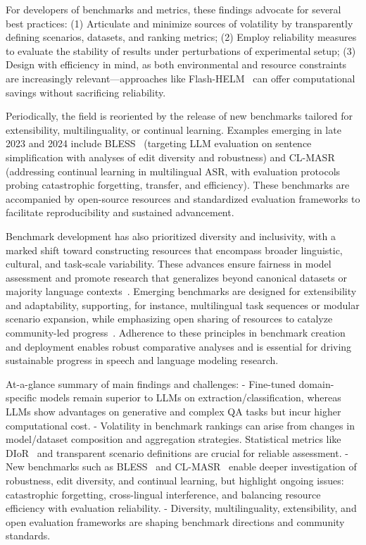 \documentclass[sigconf]{acmart}
\begin{document}
For developers of benchmarks and metrics, these findings advocate for several best practices: (1) Articulate and minimize sources of volatility by transparently defining scenarios, datasets, and ranking metrics; (2) Employ reliability measures to evaluate the stability of results under perturbations of experimental setup; (3) Design with efficiency in mind, as both environmental and resource constraints are increasingly relevant—approaches like Flash-HELM~\cite{ref104} can offer computational savings without sacrificing reliability.

Periodically, the field is reoriented by the release of new benchmarks tailored for extensibility, multilinguality, or continual learning. Examples emerging in late 2023 and 2024 include BLESS~\cite{ref106} (targeting LLM evaluation on sentence simplification with analyses of edit diversity and robustness) and CL-MASR~\cite{ref102} (addressing continual learning in multilingual ASR, with evaluation protocols probing catastrophic forgetting, transfer, and efficiency). These benchmarks are accompanied by open-source resources and standardized evaluation frameworks to facilitate reproducibility and sustained advancement.

Benchmark development has also prioritized diversity and inclusivity, with a marked shift toward constructing resources that encompass broader linguistic, cultural, and task-scale variability. These advances ensure fairness in model assessment and promote research that generalizes beyond canonical datasets or majority language contexts~\cite{ref106}. Emerging benchmarks are designed for extensibility and adaptability, supporting, for instance, multilingual task sequences or modular scenario expansion, while emphasizing open sharing of resources to catalyze community-led progress~\cite{ref102,ref104,ref106}. Adherence to these principles in benchmark creation and deployment enables robust comparative analyses and is essential for driving sustainable progress in speech and language modeling research.

At-a-glance summary of main findings and challenges:
- Fine-tuned domain-specific models remain superior to LLMs on extraction/classification, whereas LLMs show advantages on generative and complex QA tasks but incur higher computational cost.
- Volatility in benchmark rankings can arise from changes in model/dataset composition and aggregation strategies. Statistical metrics like DIoR~\cite{ref104} and transparent scenario definitions are crucial for reliable assessment.
- New benchmarks such as BLESS~\cite{ref106} and CL-MASR~\cite{ref102} enable deeper investigation of robustness, edit diversity, and continual learning, but highlight ongoing issues: catastrophic forgetting, cross-lingual interference, and balancing resource efficiency with evaluation reliability.
- Diversity, multilinguality, extensibility, and open evaluation frameworks are shaping benchmark directions and community standards.
\end{document}
